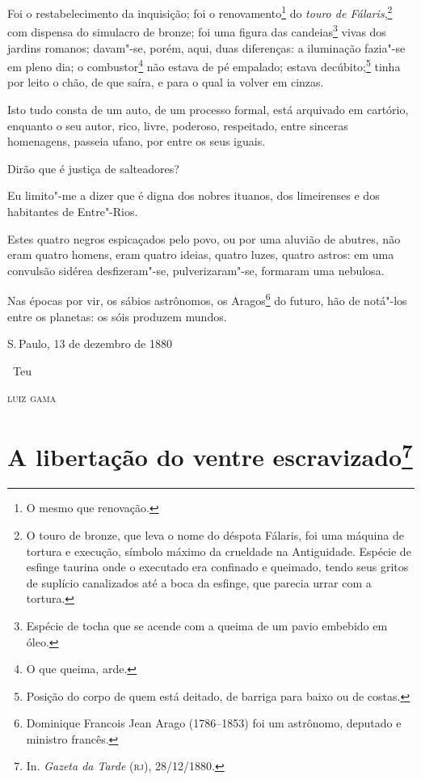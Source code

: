 Foi o restabelecimento da inquisição; foi o renovamento\footnote{O
  mesmo que renovação.} do \emph{touro de Fálaris},\footnote{O touro de
  bronze, que leva o nome do déspota Fálaris, foi uma máquina de tortura
  e execução, símbolo máximo da crueldade na Antiguidade. Espécie de
  esfinge taurina onde o executado era confinado e queimado, tendo seus
  gritos de suplício canalizados até a boca da esfinge, que parecia
  urrar com a tortura.} com dispensa do simulacro de bronze; foi uma
figura das candeias\footnote{Espécie de tocha que se acende com a
  queima de um pavio embebido em óleo.} vivas dos jardins romanos;
davam"-se, porém, aqui, duas diferenças: a iluminação fazia"-se em pleno
dia; o combustor\footnote{O que queima, arde.} não estava de pé
empalado; estava decúbito;\footnote{Posição do corpo de quem está
  deitado, de barriga para baixo ou de costas.} tinha por leito o chão,
de que saíra, e para o qual ia volver em cinzas.

Isto tudo consta de um auto, de um processo formal, está arquivado em
cartório, enquanto o seu autor, rico, livre, poderoso, respeitado, entre
sinceras homenagens, passeia ufano, por entre os seus iguais.

Dirão que é justiça de salteadores?

Eu limito"-me a dizer que é digna dos nobres ituanos, dos limeirenses e
dos habitantes de Entre"-Rios.

Estes quatro negros espicaçados pelo povo, ou por uma aluvião de
abutres, não eram quatro homens, eram quatro ideias, quatro luzes,
quatro astros: em uma convulsão sidérea desfizeram"-se, pulverizaram"-se,
formaram uma nebulosa.

Nas épocas por vir, os sábios astrônomos, os Aragos\footnote{Dominique
  Francois Jean Arago (1786--1853) foi um astrônomo, deputado e ministro
  francês.} do futuro, hão
de notá"-los entre os planetas: os sóis produzem mundos.

\bigskip

\hfill S.\,Paulo, 13 de dezembro de 1880\smallskip

\hfill\ Teu

\hfill\textsc{luiz gama}


\chapter{A libertação do ventre escravizado\footnote[*]{In. \emph{Gazeta da Tarde}
  (\textsc{rj}), 28/12/1880.}}

